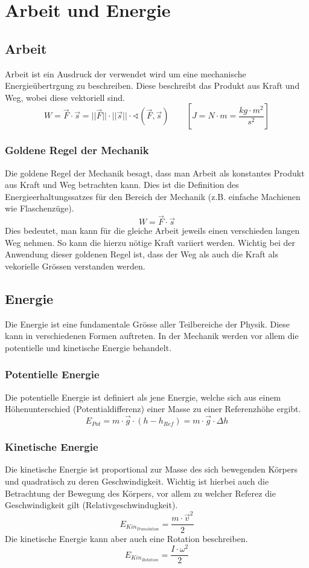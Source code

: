 \chapter{Arbeit und Energie}

\newpage
\section{Arbeit}
Arbeit ist ein Ausdruck der verwendet wird um eine mechanische 
Energieübertrgung zu beschreiben. Diese beschreibt das Produkt aus
Kraft und Weg, wobei diese vektoriell sind.
\[ \boxed{ W = \vec{F} \cdot \vec{s} 
	= ||\vec{F}|| \cdot ||\vec{s}|| \cdot 
	\sphericalangle \left( \vec{F}, \vec{s} \right) } 
	\qquad \left[ J = N \cdot m = \frac{kg \cdot m^2}{s^2} \right] \]

\subsection{Goldene Regel der Mechanik}
Die goldene Regel der Mechanik besagt, dass man Arbeit als konstantes 
Produkt aus Kraft und Weg betrachten kann. Dies ist die Definition des
Energieerhaltungssatzes für den Bereich der Mechanik (z.B. einfache
Machienen wie Flaschenzüge). 
\[ \boxed{W = \vec{F} \cdot \vec{s}} \] 
Dies bedeutet, man kann für die gleiche Arbeit jeweils einen verschieden
langen Weg nehmen. So kann die hierzu nötige Kraft variiert werden. 
Wichtig bei der Anwendung dieser goldenen Regel ist, dass der Weg als
auch die Kraft als vekorielle Grössen verstanden werden. 

\section{Energie}
Die Energie ist eine fundamentale Grösse aller Teilbereiche der Physik.
Diese kann in verschiedenen Formen auftreten. In der Mechanik werden vor
allem die potentielle und kinetische Energie behandelt.

\subsection{Potentielle Energie}
Die potentielle Energie ist definiert als jene Energie, welche sich aus
einem Höhenunterschied (Potentialdifferenz) einer Masse zu einer 
Referenzhöhe ergibt. 
\[ \boxed{ E_{Pot} 
	= m \cdot \vec{g} \cdot (h - h_{Ref})
	= m \cdot \vec{g} \cdot \Delta h 
} \]

\subsection{Kinetische Energie}
Die kinetische Energie ist proportional zur Masse des sich bewegenden Körpers
und quadratisch zu deren Geschwindigkeit. Wichtig ist hierbei auch die 
Betrachtung der Bewegung des Körpers, vor allem zu welcher Referez die 
Geschwindigkeit gilt (Relativgeschwindugkeit).
\[ \boxed{ E_{Kin_{Translation}} = \frac{m \cdot \vec{v}^2}{2} } \]
Die kinetische Energie kann aber auch eine Rotation beschreiben.
\[ \boxed{ E_{Kin_{Rotation}} = \frac{I \cdot \omega^2}{2} } \]

